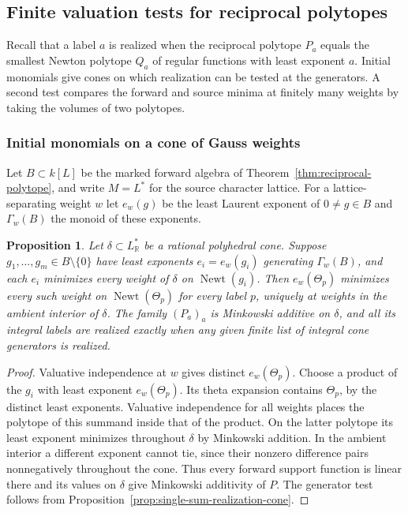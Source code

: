 \documentclass[11pt,reqno]{amsart}
\numberwithin{equation}{section}
\newtheorem{proposition}[theorem]{Proposition}
\theoremstyle{definition}
\theoremstyle{remark}
\DeclareMathOperator{\Newt}{Newt}
\begin{document}
\subsection{Finite valuation tests for reciprocal polytopes}

Recall that a label \(a\) is realized when the reciprocal polytope
\(P_a\) equals the smallest Newton polytope \(Q_a\) of regular
functions with least exponent \(a\).
Initial monomials give cones on which realization can be tested at
the generators. A second test compares the forward and source minima
at finitely many weights by taking the volumes of two polytopes.

\subsubsection{Initial monomials on a cone of Gauss weights}

Let \(B\subset k[L]\) be the marked forward algebra of
Theorem~\ref{thm:reciprocal-polytope}, and write \(M=L^*\) for the
source character lattice. For a lattice-separating
weight \(w\) let \(e_w(g)\) be the least Laurent exponent of
\(0\ne g\in B\) and \(\Gamma_w(B)\) the monoid of these exponents.

\begin{proposition}\label{prop:reciprocal-khovanskii-cone}
Let \(\delta\subset L^*_{\mathbb R}\) be a rational polyhedral cone.
Suppose \(g_1,\ldots,g_m\in B\setminus\{0\}\) have least exponents
\(e_i=e_w(g_i)\) generating \(\Gamma_w(B)\), and each \(e_i\)
minimizes every weight of \(\delta\) on \(\Newt(g_i)\).
Then \(e_w(\Theta_p)\) minimizes every such weight on
\(\Newt(\Theta_p)\) for every label \(p\), uniquely at weights in
the ambient interior of \(\delta\). The family \((P_a)_a\) is Minkowski
additive on \(\delta\), and all its integral labels are realized
exactly when any given finite list of integral cone generators is
realized.
\end{proposition}
\begin{proof}
Valuative independence at \(w\) gives distinct \(e_w(\Theta_p)\).
Choose a product of the \(g_i\) with least exponent \(e_w(\Theta_p)\).
Its theta expansion contains \(\Theta_p\), by the distinct least
exponents. Valuative independence for all weights places the polytope of
this summand inside that of the product. On the latter polytope its
least exponent minimizes throughout \(\delta\) by Minkowski addition.
In the ambient interior a different exponent cannot tie, since their
nonzero difference pairs nonnegatively throughout the cone. Thus
every forward support function is linear there and its values on
\(\delta\) give Minkowski additivity of \(P\). The generator test
follows from Proposition~\ref{prop:single-sum-realization-cone}.
\end{proof}
\end{document}
